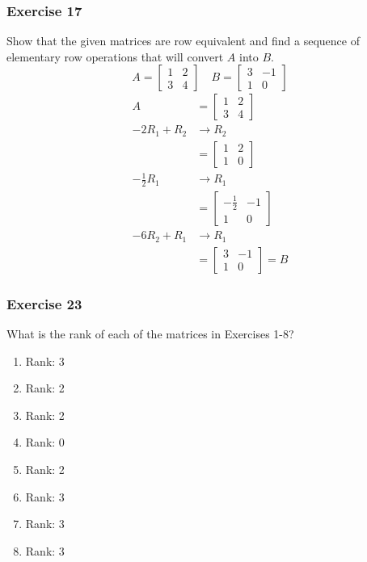 \documentclass[letterpaper, 12pt]{math}
\begin{document}
\subsubsection*{Exercise 17}
Show that the given matrices are row equivalent and find a sequence of
elementary row operations that will convert \( A \) into \( B \).
\[ A = \begin{bmatrix}
  1 & 2 \\
  3 & 4
\end{bmatrix}\quad B = \begin{bmatrix}
  3 & -1 \\
  1 & 0
\end{bmatrix} \]
\begin{align*}
  A &= \begin{bmatrix}
    1 & 2 \\
    3 & 4
  \end{bmatrix} \\
  -2R_1+R_2 &\to R_2 \\
  &= \begin{bmatrix}
    1 & 2 \\
    1 & 0
  \end{bmatrix} \\
  -\frac{1}{2}R_1 &\to R_1 \\
  &= \begin{bmatrix}
    -\frac{1}{2} & -1 \\
    1 & 0
  \end{bmatrix} \\
  -6R_2+R_1 &\to R_1 \\
  &= \begin{bmatrix}
    3 & -1 \\
    1 & 0
  \end{bmatrix} = B
\end{align*}

\subsubsection*{Exercise 23}
What is the rank of each of the matrices in Exercises 1-8?
\begin{enumerate}
  \item Rank: 3
  \item Rank: 2
  \item Rank: 2
  \item Rank: 0
  \item Rank: 2
  \item Rank: 3
  \item Rank: 3
  \item Rank: 3
\end{enumerate}
\end{document}
